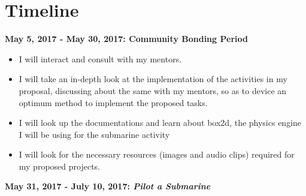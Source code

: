 \documentclass[preprint,12pt]{elsarticle}
\begin{document}




\section{Timeline}
\label{S:1}

\textbf{May 5, 2017 - May 30, 2017: Community Bonding Period}

\begin{itemize}
\item I will interact and consult with my mentors.
\item I will take an in-depth look at the implementation of the activities in my proposal, discussing about the same with my mentors, so as to device an optimum method to implement the proposed tasks.
\item I will look up the documentations and learn about box2d, the physics engine I will be using for the submarine activity
\item I will look for the necessary resources (images and audio clips) required for my proposed projects.
\end{itemize}

\textbf{May 31, 2017 - July 10, 2017: \textit{Pilot a Submarine}}
\end{document}
